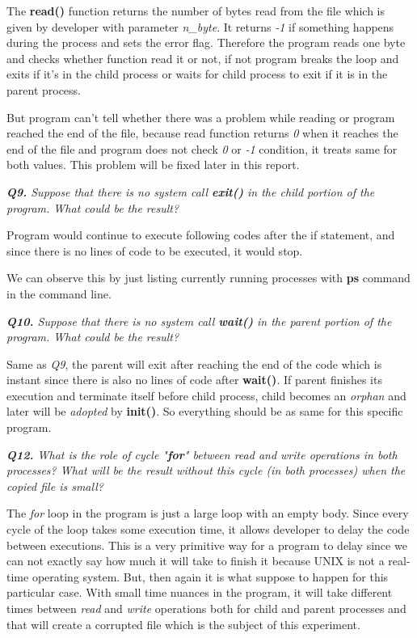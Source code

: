 \documentclass[11pt]{article}
\begin{document}
The \textbf{read()} function returns the number of bytes read from the file which is given by developer with parameter \textit{n\_byte}. It returns \textit{-1} if something happens during the process and sets the error flag. Therefore the program reads one byte and checks whether function read it or not, if not program breaks the loop and exits if it's in the child process or waits for child process to exit if it is in the parent process. 

But program can't tell whether there was a problem while reading or program reached the end of the file, because read function returns \textit{0} when it reaches the end of the file and program does not check \textit{0} or \textit{-1} condition, it treats same for both values. This problem will be fixed later in this report.


\vspace{5mm}
\textit{\textbf{Q9.} Suppose that there is no system call \textbf{exit()} in the child portion of the program. What could be the result?}
\vspace{5mm}

Program would continue to execute following codes after the if statement, and since there is no lines of code to be executed, it would stop. 

We can observe this by just listing currently running processes with \textbf{ps} command in the command line.

\vspace{5mm}
\textit{\textbf{Q10.} Suppose that there is no system call \textbf{wait()} in the parent portion of the program. What could be the result?}
\vspace{5mm}

Same as \textit{Q9}, the parent will exit after reaching the end of the code which is instant since there is also no lines of code after \textbf{wait()}. If parent finishes its execution and terminate itself before child process, child becomes an \textit{orphan} and later will be \textit{adopted} by \textbf{init()}. So everything should be as same for this specific program.

\vspace{5mm}
\textit{\textbf{Q12.} What is the role of cycle "\textbf{for}" between read and write operations in both processes? What will be the result without this cycle (in both processes) when the copied file is small?}
\vspace{5mm}

The \textit{for} loop in the program is just a large loop with an empty body. Since every cycle of the loop takes some execution time, it allows developer to delay the code between executions. This is a very primitive way for a program to delay since we can not exactly say how much it will take to finish it because UNIX is not a real-time operating system. But, then again it is what suppose to happen for this particular case. With small time nuances in the program, it will take different times between \textit{read} and \textit{write} operations both for child and parent processes and that will create a corrupted file which is the subject of this experiment.
\end{document}
